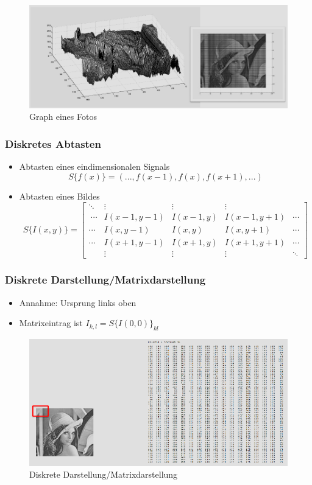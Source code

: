 \documentclass[12pt, a4paper, oneside]{article}
\begin{document}
\begin{figure}[htbp]
    \centering
    \includegraphics[scale=0.7]{../img/1-3.png}
    \caption{Graph eines Fotos}
    \label{img/1-3}
\end{figure}

\subsubsection*{Diskretes Abtasten}
\begin{itemize}
    \item Abtasten eines eindimensionalen Signals
    $$S\{f(x)\}=(...,f(x-1),f(x),f(x+1),...)$$
    \item Abtasten eines Bildes \\
    $$
    S\{I(x,y)\}=
    \begin{bmatrix}
    \ddots & \vdots & \vdots & \vdots & \\\
    \cdots & I(x-1,y-1) & I(x-1,y) & I(x-1,y+1) & \cdots\\
    \cdots & I(x,y-1) & I(x,y) & I(x,y+1) & \cdots\\
    \cdots & I(x+1,y-1) & I(x+1,y) & I(x+1,y+1) & \cdots\\
    & \vdots & \vdots & \vdots & \ddots
    \end{bmatrix}
    $$
\end{itemize}

\subsubsection*{Diskrete Darstellung/Matrixdarstellung}
\begin{itemize}
    \item Annahme: Ursprung links oben
    \item Matrixeintrag ist $I_{k,l}=S\{I(0,0)\}_{kl}$
\end{itemize}
\begin{figure}[htbp]
    \centering
    \includegraphics{../img/1-4.png}
    \caption{Diskrete Darstellung/Matrixdarstellung}
    \label{img/1-4}
\end{figure}
\end{document}
